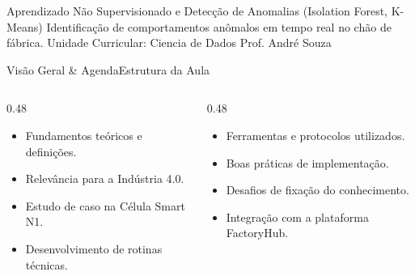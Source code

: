 
\senaicover
  {Aprendizado Não Supervisionado e Detecção de Anomalias (Isolation Forest, K-Means)}
  {Identificação de comportamentos anômalos em tempo real no chão de fábrica.}
  {Unidade Curricular: Ciencia de Dados}
  {Prof. André Souza}

\begin{senaiframe}{Visão Geral \& Agenda}{Estrutura da Aula}
  \begin{columns}[t]
    \begin{column}{0.48\textwidth}
      \begin{tcolorbox}[senaibluecard, title={1. Conceitos Chave}]
        \begin{itemize}
          \item Fundamentos teóricos e definições.
          \item Relevância para a Indústria 4.0.
        \end{itemize}
      \end{tcolorbox}
      \vspace{4pt}
      \begin{tcolorbox}[senaiambercard, title={3. Aplicação Prática}]
        \begin{itemize}
          \item Estudo de caso na Célula Smart N1.
          \item Desenvolvimento de rotinas técnicas.
        \end{itemize}
      \end{tcolorbox}
    \end{column}
    \begin{column}{0.48\textwidth}
      \begin{tcolorbox}[senairedcard, title={2. Detalhamento Técnico}]
        \begin{itemize}
          \item Ferramentas e protocolos utilizados.
          \item Boas práticas de implementação.
        \end{itemize}
      \end{tcolorbox}
      \vspace{4pt}
      \begin{tcolorbox}[senaigreencard, title={4. Exercícios \& Avaliação}]
        \begin{itemize}
          \item Desafios de fixação do conhecimento.
          \item Integração com a plataforma FactoryHub.
        \end{itemize}
      \end{tcolorbox}
    \end{column}
  \end{columns}
\end{senaiframe}

